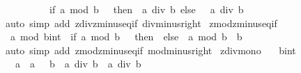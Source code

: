\begin{isabellebody}
\ \ \ \ \ \ \ \ \ \ {\isacharparenleft}{\kern0pt}if\ a\ mod\ b\ {\isacharequal}{\kern0pt}\ {}\ then\ {\isacharminus}{\kern0pt}\ {\isacharparenleft}{\kern0pt}a\ div\ b{\isacharparenright}{\kern0pt}\ else\ \ {\isacharminus}{\kern0pt}\ {\isacharparenleft}{\kern0pt}a\ div\ b{\isacharparenright}{\kern0pt}\ {\isacharminus}{\kern0pt}\ {}{\isacharparenright}{\kern0pt}{\isachardoublequoteclose}\isanewline
%
\isadelimproof
\ \ %
\endisadelimproof
%
\isatagproof
{}\isamarkupfalse%
\ {\isacharparenleft}{\kern0pt}auto\ simp\ add{\isacharcolon}{\kern0pt}\ zdiv{\isacharunderscore}{\kern0pt}zminus{}{\isacharunderscore}{\kern0pt}eq{\isacharunderscore}{\kern0pt}if\ div{\isacharunderscore}{\kern0pt}minus{\isacharunderscore}{\kern0pt}right{\isacharparenright}{\kern0pt}%
\endisatagproof
{\isafoldproof}%
%
\isadelimproof
\isanewline
%
\endisadelimproof
\isanewline
{}\isamarkupfalse%
\ zmod{\isacharunderscore}{\kern0pt}zminus{}{\isacharunderscore}{\kern0pt}eq{\isacharunderscore}{\kern0pt}if{\isacharcolon}{\kern0pt}\isanewline
\ \ {\isachardoublequoteopen}a\ mod\ {\isacharparenleft}{\kern0pt}{\isacharminus}{\kern0pt}b{\isacharcolon}{\kern0pt}{\isacharcolon}{\kern0pt}int{\isacharparenright}{\kern0pt}\ {\isacharequal}{\kern0pt}\ {\isacharparenleft}{\kern0pt}if\ a\ mod\ b\ {\isacharequal}{\kern0pt}\ {}\ then\ {}\ else\ \ {\isacharparenleft}{\kern0pt}a\ mod\ b{\isacharparenright}{\kern0pt}\ {\isacharminus}{\kern0pt}\ b{\isacharparenright}{\kern0pt}{\isachardoublequoteclose}\isanewline
%
\isadelimproof
\ \ %
\endisadelimproof
%
\isatagproof
{}\isamarkupfalse%
\ {\isacharparenleft}{\kern0pt}auto\ simp\ add{\isacharcolon}{\kern0pt}\ zmod{\isacharunderscore}{\kern0pt}zminus{}{\isacharunderscore}{\kern0pt}eq{\isacharunderscore}{\kern0pt}if\ mod{\isacharunderscore}{\kern0pt}minus{\isacharunderscore}{\kern0pt}right{\isacharparenright}{\kern0pt}%
\endisatagproof
{\isafoldproof}%
%
\isadelimproof
%
\endisadelimproof
%
\isadelimdocument
%
\endisadelimdocument
%
\isatagdocument
%
\isamarkuptrue%
%
\endisatagdocument
{\isafolddocument}%
%
\isadelimdocument
%
\endisadelimdocument
{}\isamarkupfalse%
\ zdiv{\isacharunderscore}{\kern0pt}mono{}{\isacharcolon}{\kern0pt}\isanewline
\ \ \ b{\isacharcolon}{\kern0pt}{\isacharcolon}{\kern0pt}int\isanewline
\ \ \ {\isachardoublequoteopen}a\ {\isasymle}\ a{\isacharprime}{\kern0pt}{\isachardoublequoteclose}\ {\isachardoublequoteopen}{}\ {\isacharless}{\kern0pt}\ b{\isachardoublequoteclose}\ \ {\isachardoublequoteopen}a\ div\ b\ {\isasymle}\ a{\isacharprime}{\kern0pt}\ div\ b{\isachardoublequoteclose}\isanewline

\end{isabellebody}
